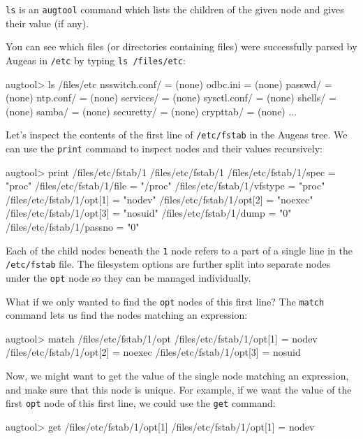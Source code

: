 \verb!ls! is an \verb!augtool! command which lists the children of the given node and gives their value (if any).

You can see which files (or directories containing files) were successfully parsed by Augeas in \nolinkurl{/etc} by typing \verb!ls /files/etc!:

\begin{augtoolsh}[]
augtool> ls /files/etc
nsswitch.conf/ = (none)
odbc.ini = (none)
passwd/ = (none)
ntp.conf/ = (none)
services/ = (none)
sysctl.conf/ = (none)
shells/ = (none)
samba/ = (none)
securetty/ = (none)
crypttab/ = (none)
...
\end{augtoolsh}


Let's inspect the contents of the first line of \nolinkurl{/etc/fstab} in the Augeas tree. We can use the \verb!print! command to inspect nodes and their values recursively:

\begin{augtoolsh}[]
augtool> print /files/etc/fstab/1
/files/etc/fstab/1
/files/etc/fstab/1/spec = "proc"
/files/etc/fstab/1/file = "/proc"
/files/etc/fstab/1/vfstype = "proc"
/files/etc/fstab/1/opt[1] = "nodev"
/files/etc/fstab/1/opt[2] = "noexec"
/files/etc/fstab/1/opt[3] = "nosuid"
/files/etc/fstab/1/dump = "0"
/files/etc/fstab/1/passno = "0"
\end{augtoolsh}

Each of the child nodes beneath the \verb!1! node refers to a part of a single line in the \nolinkurl{/etc/fstab} file. The filesystem options are further split into separate nodes under the \verb!opt! node so they can be managed individually.

What if we only wanted to find the \verb!opt! nodes of this first line? The \verb!match! command lets us find the nodes matching an expression:


\begin{augtoolsh}[]
augtool> match /files/etc/fstab/1/opt
/files/etc/fstab/1/opt[1] = nodev
/files/etc/fstab/1/opt[2] = noexec
/files/etc/fstab/1/opt[3] = nosuid
\end{augtoolsh}

Now, we might want to get the value of the single node matching an expression, and make sure that this node is unique. For example, if we want the value of the first \verb!opt! node of this first line, we could use the \verb!get! command:

\begin{augtoolsh}[]
augtool> get /files/etc/fstab/1/opt[1]
/files/etc/fstab/1/opt[1] = nodev
\end{augtoolsh}

